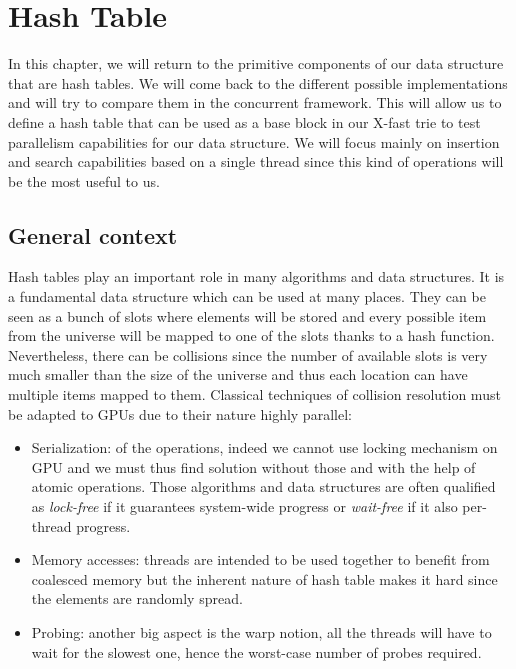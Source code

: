 
\chapter{Hash Table}\label{Hash table}

In this chapter, we will return to the primitive components of our data structure that are hash tables. We will come back to the different possible implementations and will try to compare them in the concurrent framework. This will allow us to define a hash table that can be used as a base block in our X-fast trie to test parallelism capabilities for our data structure. We will focus mainly on insertion and search capabilities based on a single thread since this kind of operations will be the most useful to us.

\section{General context}

Hash tables play an important role in many algorithms and data structures. It is a fundamental data structure which can be used at many places. They can be seen as a bunch of slots where elements will be stored and every possible item from the universe will be mapped to one of the slots thanks to a hash function. Nevertheless, there can be collisions since the number of available slots is very much smaller than the size of the universe and thus each location can have multiple items mapped to them. Classical techniques of collision resolution must be adapted to GPUs due to their nature highly parallel:

\begin{itemize}
    \item Serialization: of the operations, indeed we cannot use locking mechanism on GPU and we must thus find solution without those and with the help of atomic operations. Those algorithms and data structures are often qualified as \textit{lock-free} if it guarantees system-wide progress or \textit{wait-free} if it also per-thread progress.
    \item Memory accesses: threads are intended to be used together to benefit from coalesced memory but the inherent nature of hash table makes it hard since the elements are randomly spread.
    \item Probing: another big aspect is the warp notion, all the threads will have to wait for the slowest one, hence the worst-case number of probes required.\\
\end{itemize}

